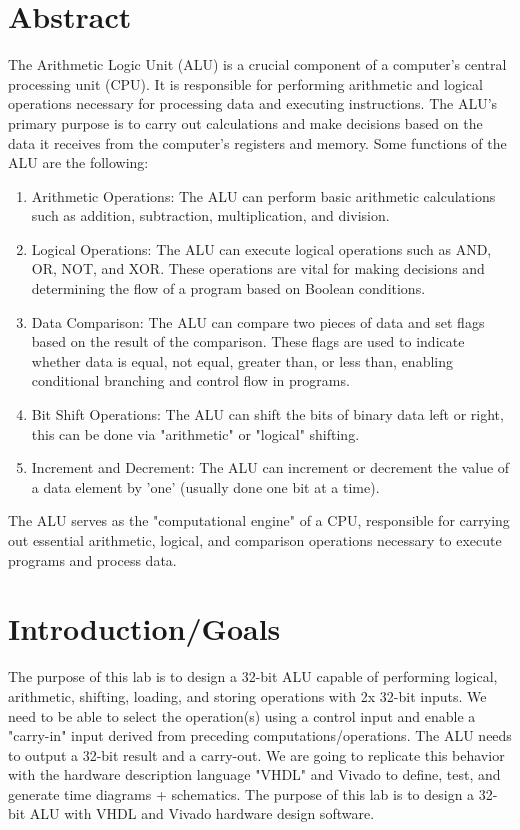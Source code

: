 \documentclass[notitlepage,a4paper,oneside,article,table]{article}
\begin{document}
\fi

\section{Abstract}
The Arithmetic Logic Unit (ALU) is a crucial component of a computer's central processing unit (CPU). It is responsible for performing arithmetic and logical operations necessary for processing data and executing instructions. The ALU's primary purpose is to carry out calculations and make decisions based on the data it receives from the computer's registers and memory. Some functions of the ALU are the following:

\begin{enumerate}
    \item Arithmetic Operations: The ALU can perform basic arithmetic calculations such as addition, subtraction, multiplication, and division. 

    \item Logical Operations: The ALU can execute logical operations such as AND, OR, NOT, and XOR. These operations are vital for making decisions and determining the flow of a program based on Boolean conditions.

    \item Data Comparison: The ALU can compare two pieces of data and set flags based on the result of the comparison. These flags are used to indicate whether data is equal, not equal, greater than, or less than, enabling conditional branching and control flow in programs.

    \item Bit Shift Operations: The ALU can shift the bits of binary data left or right, this can be done via "arithmetic" or "logical" shifting.

    \item Increment and Decrement: The ALU can increment or decrement the value of a data element by 'one' (usually done one bit at a time).

\end{enumerate}

The ALU serves as the "computational engine" of a CPU, responsible for carrying out essential arithmetic, logical, and comparison operations necessary to execute programs and process data.

\section{Introduction/Goals}
The purpose of this lab is to design a 32-bit ALU capable of performing logical, arithmetic, shifting, loading, and storing operations with 2x 32-bit inputs. We need to be able to select the operation(s) using a control input and enable a "carry-in" input derived from preceding computations/operations. The ALU needs to output a 32-bit result and a carry-out. We are going to replicate this behavior with the hardware description language "VHDL" and Vivado to define, test, and generate time diagrams + schematics. The purpose of this lab is to design a 32-bit ALU with VHDL and Vivado hardware design software.
\end{document}
